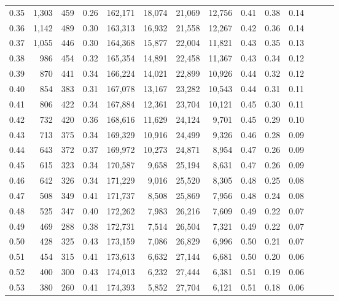 \begin{tabular}{rrrrrrrrrrrrrr}
0.35 &  1,303 &  459 &  0.26 &  162,171 &   18,074 &  21,069 &  12,756 &  0.41 &  0.38 &      0.14 \\
0.36 &  1,142 &  489 &  0.30 &  163,313 &   16,932 &  21,558 &  12,267 &  0.42 &  0.36 &      0.14 \\
0.37 &  1,055 &  446 &  0.30 &  164,368 &   15,877 &  22,004 &  11,821 &  0.43 &  0.35 &      0.13 \\
0.38 &    986 &  454 &  0.32 &  165,354 &   14,891 &  22,458 &  11,367 &  0.43 &  0.34 &      0.12 \\
0.39 &    870 &  441 &  0.34 &  166,224 &   14,021 &  22,899 &  10,926 &  0.44 &  0.32 &      0.12 \\
0.40 &    854 &  383 &  0.31 &  167,078 &   13,167 &  23,282 &  10,543 &  0.44 &  0.31 &      0.11 \\
0.41 &    806 &  422 &  0.34 &  167,884 &   12,361 &  23,704 &  10,121 &  0.45 &  0.30 &      0.11 \\
0.42 &    732 &  420 &  0.36 &  168,616 &   11,629 &  24,124 &   9,701 &  0.45 &  0.29 &      0.10 \\
0.43 &    713 &  375 &  0.34 &  169,329 &   10,916 &  24,499 &   9,326 &  0.46 &  0.28 &      0.09 \\
0.44 &    643 &  372 &  0.37 &  169,972 &   10,273 &  24,871 &   8,954 &  0.47 &  0.26 &      0.09 \\
0.45 &    615 &  323 &  0.34 &  170,587 &    9,658 &  25,194 &   8,631 &  0.47 &  0.26 &      0.09 \\
0.46 &    642 &  326 &  0.34 &  171,229 &    9,016 &  25,520 &   8,305 &  0.48 &  0.25 &      0.08 \\
0.47 &    508 &  349 &  0.41 &  171,737 &    8,508 &  25,869 &   7,956 &  0.48 &  0.24 &      0.08 \\
0.48 &    525 &  347 &  0.40 &  172,262 &    7,983 &  26,216 &   7,609 &  0.49 &  0.22 &      0.07 \\
0.49 &    469 &  288 &  0.38 &  172,731 &    7,514 &  26,504 &   7,321 &  0.49 &  0.22 &      0.07 \\
0.50 &    428 &  325 &  0.43 &  173,159 &    7,086 &  26,829 &   6,996 &  0.50 &  0.21 &      0.07 \\
0.51 &    454 &  315 &  0.41 &  173,613 &    6,632 &  27,144 &   6,681 &  0.50 &  0.20 &      0.06 \\
0.52 &    400 &  300 &  0.43 &  174,013 &    6,232 &  27,444 &   6,381 &  0.51 &  0.19 &      0.06 \\
0.53 &    380 &  260 &  0.41 &  174,393 &    5,852 &  27,704 &   6,121 &  0.51 &  0.18 &      0.06 \\

\end{tabular}

